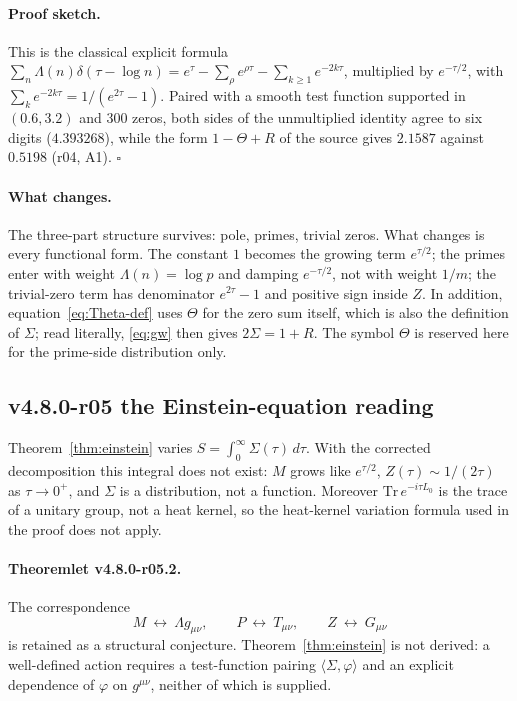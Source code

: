 \paragraph{Proof sketch.}
This is the classical explicit formula
\(\sum_n\Lambda(n)\delta(\tau-\log n)=e^\tau-\sum_\rho e^{\rho\tau}-\sum_{k\ge1}e^{-2k\tau}\),
multiplied by \(e^{-\tau/2}\), with \(\sum_k e^{-2k\tau}=1/(e^{2\tau}-1)\).  Paired with a smooth
test function supported in \((0.6,3.2)\) and 300 zeros, both sides of the unmultiplied identity
agree to six digits (\(4.393268\)), while the form \(1-\Theta+R\) of the source gives
\(2.1587\) against \(0.5198\) (r04, A1).  \(\square\)

\paragraph{What changes.}
The three-part structure survives: pole, primes, trivial zeros.  What changes is every
functional form.  The constant \(1\) becomes the growing term \(e^{\tau/2}\); the primes enter with
weight \(\Lambda(n)=\log p\) and damping \(e^{-\tau/2}\), not with weight \(1/m\); the trivial-zero
term has denominator \(e^{2\tau}-1\) and positive sign inside \(Z\).  In addition,
equation~\eqref{eq:Theta-def} uses \(\Theta\) for the zero sum itself, which is also the
definition of \(\Sigma\); read literally, \eqref{eq:gw} then gives \(2\Sigma=1+R\).  The symbol
\(\Theta\) is reserved here for the prime-side distribution only.

\subsection*{v4.8.0-r05 the Einstein-equation reading}
\label{subsec:v480-r05-einstein-reading}

Theorem~\ref{thm:einstein} varies \(S=\int_0^\infty\Sigma(\tau)\,d\tau\).  With the corrected
decomposition this integral does not exist: \(M\) grows like \(e^{\tau/2}\), \(Z(\tau)\sim1/(2\tau)\)
as \(\tau\to0^+\), and \(\Sigma\) is a distribution, not a function.  Moreover
\(\mathrm{Tr}\,e^{-i\tau L_0}\) is the trace of a unitary group, not a heat kernel, so the heat-kernel
variation formula used in the proof does not apply.

\paragraph{Theoremlet v4.8.0-r05.2.}
The correspondence
\[
M\ \leftrightarrow\ \Lambda g_{\mu\nu},\qquad
P\ \leftrightarrow\ T_{\mu\nu},\qquad
Z\ \leftrightarrow\ G_{\mu\nu}
\]
is retained as a structural conjecture.  Theorem~\ref{thm:einstein} is not derived: a well-defined
action requires a test-function pairing \(\langle\Sigma,\varphi\rangle\) and an explicit dependence
of \(\varphi\) on \(g^{\mu\nu}\), neither of which is supplied.

